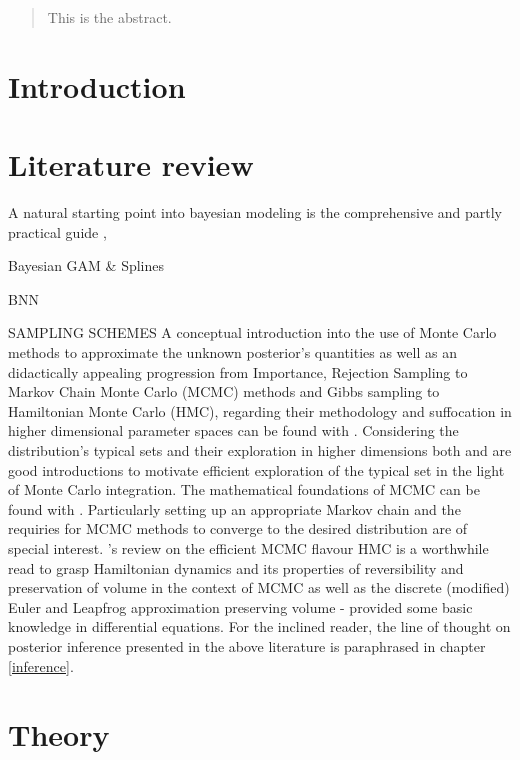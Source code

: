 \documentclass[11pt]{article}
\begin{document}
    \clearpage
    \begin{abstract}
        This is the abstract.
    \end{abstract}

    \section{Introduction}

    \section{Literature review}
    A natural starting point into bayesian modeling is the comprehensive and partly practical guide \cite{gelman2013bayesian},

    Bayesian GAM \& Splines
    \cite{fahrmeir2013regression}

    BNN

    SAMPLING SCHEMES
    A conceptual introduction into the use of Monte Carlo methods to approximate the unknown posterior's quantities as well as an didactically appealing progression from Importance, Rejection Sampling to Markov Chain Monte Carlo (MCMC) methods and Gibbs sampling to Hamiltonian Monte Carlo (HMC), regarding their methodology and suffocation in higher dimensional parameter spaces can be found with \cite{mackay2003information}. Considering the distribution's typical sets and their exploration in higher dimensions both \cite{mackay2003information} and \cite{betancourt2017conceptual} are good introductions to motivate efficient exploration of the typical set in the light of Monte Carlo integration.
    The mathematical foundations of MCMC can be found with \cite{brooks2011handbook}. Particularly setting up an appropriate Markov chain and the requiries for MCMC methods to converge to the desired distribution are of special interest. \cite{neal2011mcmc}'s review on the efficient MCMC flavour HMC is a worthwhile read to grasp Hamiltonian dynamics and its properties of reversibility and preservation of volume in the context of MCMC as well as the discrete (modified) Euler and Leapfrog approximation preserving volume - provided some basic knowledge in differential equations. For the inclined reader, the line of thought on posterior inference presented in the above literature is paraphrased in chapter \ref{inference}.


    \clearpage
    \section{Theory}
\end{document}
